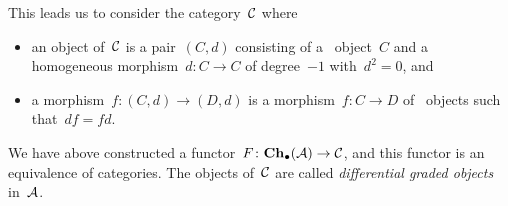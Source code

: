 \begin{remark}
\begin{enumerate}
      This leads us to consider the category~$\mathcal{C}$ where
      \begin{itemize}
        \item
          an object of~$\mathcal{C}$ is a pair~$(C,d)$ consisting of a~ object~$C$ and a homogeneous morphism~$d \colon C \to C$ of degree~$-1$ with~$d^2 = 0$, and
        \item
          a morphism~$f \colon (C,d) \to (D,d)$ is a morphism~$f \colon C \to D$ of~ objects such that~$d f = f d$.
      \end{itemize}
      We have above constructed a functor~$F \colon \mathbf{Ch}_\bullet(\mathcal{A}) \to \mathcal{C}$, and this functor is an equivalence of categories.
      The objects of~$\mathcal{C}$ are called \emph{differential graded objects} in~$\mathcal{A}$.
  \end{enumerate}
\end{remark}




